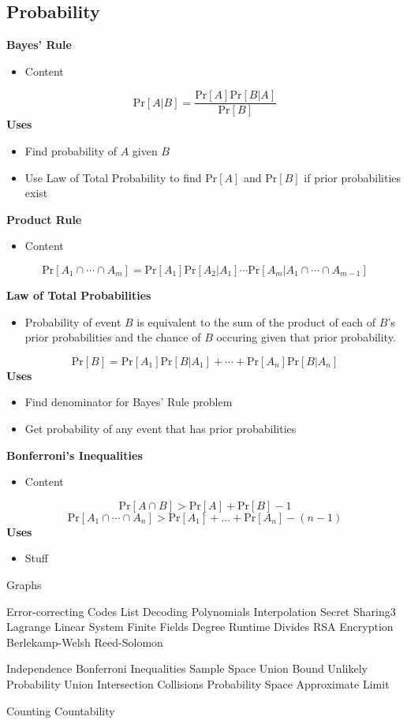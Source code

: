 \documentclass{article}\usepackage{amsmath,amssymb,amsthm,tikz,tkz-graph,color,chngpage,soul,hyperref,csquotes,graphicx,floatrow, listings}\newcommand*{\QEDB}{\hfill\ensuremath{\square}}\newtheorem*{prop}{Proposition}\renewcommand{\theenumi}{\alph{enumi}}\usepackage[shortlabels]{enumitem}\usepackage[nobreak=true]{mdframed}\usetikzlibrary{matrix,calc}\MakeOuterQuote{"}\usepackage[margin=0.75in]{geometry} \newtheorem{theorem}{Theorem}\newcommand{\Z}{\mathbb Z}\newcommand{\R}{\mathbb R}\newcommand{\Q}{\mathbb Q}\newcommand{\N}{\mathbb N}\newcommand{\x}[1]{\textrm{ #1 }}\newcommand{\pr}{\textrm{Pr}}
\newcommand{\eq}[1]{\begin{equation}#1\end{equation}}
\begin{document}
\subsection*{Probability}
\textbf{Bayes' Rule}
\begin{itemize}
    \item Content
\end{itemize}
\begin{mdframed}
\eq{\pr[A|B]=\frac{\pr[A]\pr[B|A]}{\pr[B]}}
\textbf{Uses}
\begin{itemize}
    \item Find probability of $A$ given $B$
    \item Use Law of Total Probability to find $\pr[A]$ and $\pr[B]$ if prior probabilities exist
\end{itemize}
\end{mdframed}
\textbf{Product Rule}
\begin{itemize}
    \item Content
\end{itemize}
\begin{mdframed}
\eq{\pr[A_1\cap\cdots\cap A_m]=\pr[A_1]\pr[A_2|A_1]\cdots\pr[A_m|A_1\cap\cdots\cap A_{m-1}]}
\end{mdframed}
\textbf{Law of Total Probabilities}
\begin{itemize}
    \item Probability of event $B$ is equivalent to the sum of the product of each of $B$'s prior probabilities and the chance of $B$ occuring given that prior probability.
\end{itemize}
\begin{mdframed}
\eq{\pr[B]=\pr[A_1]\pr[B|A_1]+\cdots+\pr[A_n]\pr[B|A_n]}
\textbf{Uses}
\begin{itemize}
    \item Find denominator for Bayes' Rule problem
    \item Get probability of any event that has prior probabilities
\end{itemize}
\end{mdframed}
\textbf{Bonferroni's Inequalities}
\begin{itemize}
    \item Content
\end{itemize}
\begin{mdframed}
\eq{\pr[A \cap B] > \pr[A] + \pr[B] - 1}
\eq{\pr[A_1 \cap\cdots\cap A_n] > \pr[A_1] + . . . + \pr[A_n] - (n - 1)}
\textbf{Uses}
\begin{itemize}
    \item Stuff
\end{itemize}
\end{mdframed}

Graphs

Error-correcting Codes
List Decoding
Polynomials
	Interpolation
		Secret Sharing3
		Lagrange
		Linear System
	Finite Fields
	Degree
	Runtime
	Divides
RSA Encryption
Berlekamp-Welsh
Reed-Solomon

Independence
Bonferroni Inequalities
Sample Space
Union Bound
Unlikely Probability
Union
Intersection
Collisions
Probability Space
Approximate Limit

Counting
Countability
\end{document}
